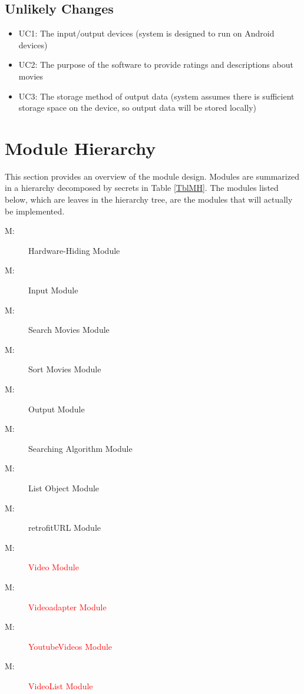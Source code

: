 \documentclass[12pt, titlepage]{article}
\newcounter{mnum}
\newcommand{\mthemnum}{M\themnum}
\begin{document}
\subsection{Unlikely Changes} \label{SecUchange}
\begin{itemize}
	\item UC1: The input/output devices (system is designed to run on Android devices) 
	\item UC2: The purpose of the software to provide ratings and descriptions about movies
	\item UC3: The storage method of output data (system assumes there is sufficient storage space on the device, so output data will be stored locally)
\end{itemize}

\section{Module Hierarchy} \label{SecMH}
This section provides an overview of the module design. Modules are summarized
in a hierarchy decomposed by secrets in Table \ref{TblMH}. The modules listed
below, which are leaves in the hierarchy tree, are the modules that will
actually be implemented.

\begin{description}
\item [ \mthemnum \label{mHH}:] Hardware-Hiding Module
\item[ \mthemnum \label{mHH}:] Input Module
\item[ \mthemnum \label{mHH}:] Search Movies Module
\item[ \mthemnum \label{mHH}:] Sort Movies Module
\item[ \mthemnum \label{mHH}:] Output Module
\item[ \mthemnum \label{mHH}:] Searching Algorithm Module
\item[ \mthemnum \label{mHH}:] List Object Module
\item[ \mthemnum \label{mHH}:] retrofitURL Module
\item[ \mthemnum \label{mHH}:] \textcolor{red}{Video Module}
\item[ \mthemnum \label{mHH}:] \textcolor{red}{Videoadapter Module}
\item[ \mthemnum \label{mHH}:] \textcolor{red}{YoutubeVideos Module}
\item[ \mthemnum \label{mHH}:] \textcolor{red}{VideoList Module}

\end{description}
\end{document}

